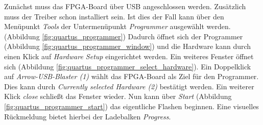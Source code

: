     Zunächst muss das FPGA-Board über USB angeschlossen werden. Zusätzlich muss der Treiber schon installiert sein.
    Ist dies der Fall kann über den Menüpunkt \textit{Tools} der Untermenüpunkt \textit{Programmer}
    ausgewählt werden. (Abbildung \ref{fig:quartus_programmer})
    Dadurch öffnet sich der Programmer (Abbildung \ref{fig:quartus_programmer_window})
    und die Hardware kann durch einen Klick auf \textit{Hardware Setup} eingerichtet werden.
    Ein weiteres Fenster öffnet sich (Abbildung \ref{fig:quartus_programmer_select_hardware}).
    Ein Doppelklick auf \textit{Arrow-USB-Blaster (1)} wählt das FPGA-Board als Ziel für den Programmer.
    Dies kann durch \textit{Currently selected Hardware (2)} bestätigt werden. Ein weiterer Klick 
    \textit{close} schließt das Fenster wieder. Nun kann über \textit{Start}
    (Abbildung \ref{fig:quartus_programmer_start}) das eigentliche Flashen beginnen.
    Eine visuelles Rückmeldung bietet hierbei der Ladebalken \textit{Progress}.
    


